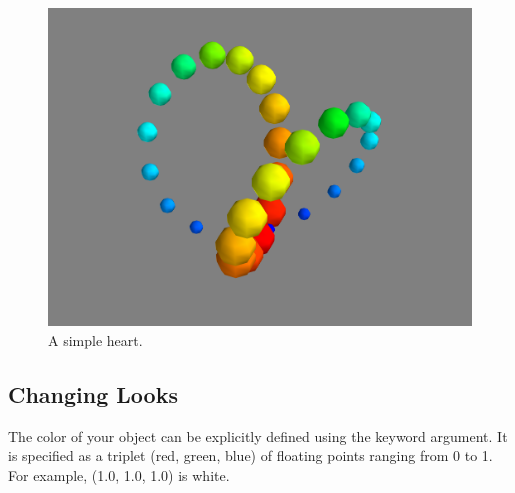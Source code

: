 \begin{figure}
\includegraphics[width=\textwidth]{points3d.png}
\caption{A simple heart.}
\label{fig:points3d}
\end{figure}

\subsection*{Changing Looks}
The color of your object can be explicitly defined using the  keyword argument.
It is specified as a triplet (red, green, blue) of floating points ranging from 0 to 1.
For example, (1.0, 1.0, 1.0) is white.

